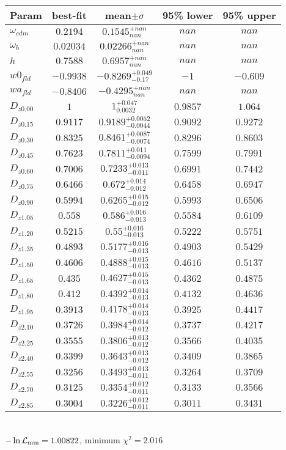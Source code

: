 \begin{tabular}{|l|c|c|c|c|} 
 \hline 
Param & best-fit & mean$\pm\sigma$ & 95\% lower & 95\% upper \\ \hline 
$\omega_{cdm }$ &$0.2194$ & $0.1545_{nan}^{+nan}$ & $nan$ & $nan$ \\ 
$\omega_{b }$ &$0.02034$ & $0.02266_{nan}^{+nan}$ & $nan$ & $nan$ \\ 
$h$ &$0.7588$ & $0.6957_{nan}^{+nan}$ & $nan$ & $nan$ \\ 
$w0_{fld }$ &$-0.9938$ & $-0.8269_{-0.17}^{+0.049}$ & $-1$ & $-0.609$ \\ 
$wa_{fld }$ &$-0.8406$ & $-0.4295_{nan}^{+nan}$ & $nan$ & $nan$ \\ 
$D_{z0.00 }$ &$1$ & $1_{0.0032}^{+0.047}$ & $0.9857$ & $1.064$ \\ 
$D_{z0.15 }$ &$0.9117$ & $0.9189_{-0.0044}^{+0.0052}$ & $0.9092$ & $0.9272$ \\ 
$D_{z0.30 }$ &$0.8325$ & $0.8461_{-0.0074}^{+0.0087}$ & $0.8296$ & $0.8603$ \\ 
$D_{z0.45 }$ &$0.7623$ & $0.7811_{-0.0094}^{+0.011}$ & $0.7599$ & $0.7991$ \\ 
$D_{z0.60 }$ &$0.7006$ & $0.7233_{-0.011}^{+0.013}$ & $0.6991$ & $0.7442$ \\ 
$D_{z0.75 }$ &$0.6466$ & $0.672_{-0.012}^{+0.014}$ & $0.6458$ & $0.6947$ \\ 
$D_{z0.90 }$ &$0.5994$ & $0.6265_{-0.012}^{+0.015}$ & $0.5993$ & $0.6506$ \\ 
$D_{z1.05 }$ &$0.558$ & $0.586_{-0.013}^{+0.016}$ & $0.5584$ & $0.6109$ \\ 
$D_{z1.20 }$ &$0.5215$ & $0.55_{-0.013}^{+0.016}$ & $0.5222$ & $0.5751$ \\ 
$D_{z1.35 }$ &$0.4893$ & $0.5177_{-0.013}^{+0.016}$ & $0.4903$ & $0.5429$ \\ 
$D_{z1.50 }$ &$0.4606$ & $0.4888_{-0.013}^{+0.015}$ & $0.4616$ & $0.5137$ \\ 
$D_{z1.65 }$ &$0.435$ & $0.4627_{-0.013}^{+0.015}$ & $0.4362$ & $0.4875$ \\ 
$D_{z1.80 }$ &$0.412$ & $0.4392_{-0.013}^{+0.014}$ & $0.4132$ & $0.4636$ \\ 
$D_{z1.95 }$ &$0.3913$ & $0.4178_{-0.013}^{+0.014}$ & $0.3925$ & $0.4417$ \\ 
$D_{z2.10 }$ &$0.3726$ & $0.3984_{-0.012}^{+0.014}$ & $0.3737$ & $0.4217$ \\ 
$D_{z2.25 }$ &$0.3555$ & $0.3806_{-0.012}^{+0.013}$ & $0.3566$ & $0.4035$ \\ 
$D_{z2.40 }$ &$0.3399$ & $0.3643_{-0.012}^{+0.013}$ & $0.3409$ & $0.3865$ \\ 
$D_{z2.55 }$ &$0.3256$ & $0.3493_{-0.011}^{+0.013}$ & $0.3264$ & $0.3709$ \\ 
$D_{z2.70 }$ &$0.3125$ & $0.3354_{-0.011}^{+0.012}$ & $0.3133$ & $0.3566$ \\ 
$D_{z2.85 }$ &$0.3004$ & $0.3226_{-0.011}^{+0.012}$ & $0.3011$ & $0.3431$ \\ 
\hline 
 \end{tabular} \\ 
$-\ln{\cal L}_\mathrm{min} =1.00822$, minimum $\chi^2=2.016$ \\ 
